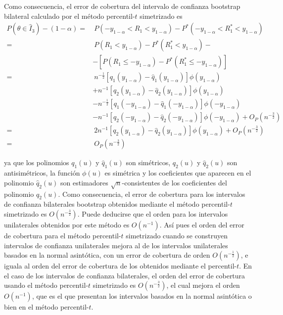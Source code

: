 \documentclass[]{book}
\theoremstyle{break}
\theoremstyle{definition}
\theoremstyle{definition}
\theoremstyle{definition}
\theoremstyle{remark}
\begin{document}
Como consecuencia, el error de cobertura del intervalo de confianza
bootstrap bilateral calculado por el método percentil-\(t\) simetrizado
es \[\begin{aligned}
P\left( \theta \in \hat{I}_3 \right) -\left( 1-\alpha \right) 
=&\ P\left(-y_{1-\alpha }<R_1<y_{1-\alpha } \right) -P^{\ast}\left( -y_{1-\alpha
}<R_1^{\ast}<y_{1-\alpha } \right) \\
=&\ P\left( R_1<y_{1-\alpha } \right) -P^{\ast}\left( R_1^{\ast
}<y_{1-\alpha } \right) - \\
&-\left[ P\left( R_1\leq -y_{1-\alpha } \right) -P^{\ast}\left( R_1^{\ast
}\leq -y_{1-\alpha } \right) \right] \\
=&\ n^{-\frac{1}{2}}\left[ q_1\left( y_{1-\alpha } \right) -\hat{q}_1\left(
y_{1-\alpha } \right) \right] \phi \left( y_{1-\alpha } \right) \\
&+n^{-1}\left[ q_2\left( y_{1-\alpha } \right) -\hat{q}_2\left(
y_{1-\alpha } \right) \right] \phi \left( y_{1-\alpha } \right) \\
&-n^{-\frac{1}{2}}\left[ q_1\left( -y_{1-\alpha } \right) -\hat{q}_1\left(
-y_{1-\alpha } \right) \right] \phi \left( -y_{1-\alpha } \right) \\
&-n^{-1}\left[ q_2\left( -y_{1-\alpha } \right) -\hat{q}_2\left(
-y_{1-\alpha } \right) \right] \phi \left( -y_{1-\alpha } \right) +O_{P}\left(
n^{-\frac{3}{2}} \right) \\
=&\ 2n^{-1}\left[ q_2\left( y_{1-\alpha } \right) -\hat{q}_2\left(
y_{1-\alpha } \right) \right] \phi \left( y_{1-\alpha } \right) +O_{P}\left(
n^{-\frac{3}{2}} \right) \\
=&\ O_{P}\left( n^{-\frac{3}{2}} \right)
\end{aligned}\]

ya que los polinomios \(q_1\left( u \right)\) y
\(\hat{q}_1\left( u \right)\) son simétricos, \(q_2\left( u \right)\) y
\(\hat{q}_2\left( u \right)\) son antisimétricos, la función
\(\phi \left( u \right)\) es simétrica y los coeficientes que aparecen
en el polinomio \(\hat{q}_2\left( u \right)\) son estimadores
\(\sqrt{n}\)-consistentes de los coeficientes del polinomio
\(q_2\left( u \right)\). Como consecuencia, el error de cobertura para
los intervalos de confianza bilaterales bootstrap obtenidos mediante el
método percentil-\(t\) simetrizado es
\(O\left( n^{-\frac{3}{2}} \right)\). Puede deducirse que el orden para
los intervalos unilaterales obtenidos por este método es
\(O\left( n^{-1} \right)\). Así pues el orden del error de cobertura
para el método percentil-\(t\) simetrizado cuando se construyen
intervalos de confianza unilaterales mejora al de los intervalos
unilaterales basados en la normal asintótica, con un error de cobertura
de orden \(O\left( n^{-\frac{1}{2}} \right)\), e iguala al orden del
error de cobertura de los obtenidos mediante el percentil-\(t\). En el
caso de los intervalos de confianza bilaterales, el orden del error de
cobertura usando el método percentil-\(t\) simetrizado es
\(O\left( n^{-\frac{3}{2}} \right)\), el cual mejora el orden
\(O\left( n^{-1} \right)\), que es el que presentan los intervalos
basados en la normal asintótica o bien en el método percentil-\(t\).
\end{document}
